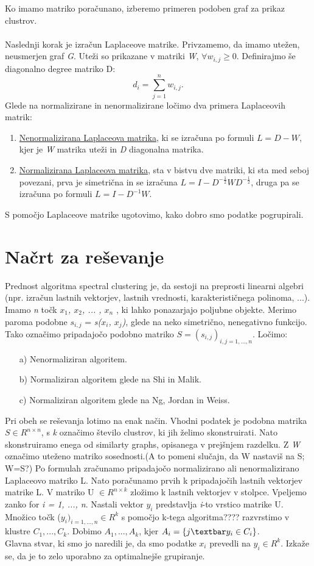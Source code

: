 \documentclass[a4paper, 10pt]{article}
\begin{document}
Ko imamo matriko poračunano, izberemo primeren podoben graf za prikaz clustrov.\\
\\
Naslednji korak je izračun Laplaceove matrike. Privzamemo, da imamo utežen, neusmerjen graf \textsl{G}. Uteži so prikazane v matriki \textsl{W}, $\forall w_{i,j}\geq 0$. Definirajmo še diagonalno degree matriko D: $$ d_i = \sum_{j=1}^n w_{i,j}.$$Glede na normalizirane in nenormalizirane ločimo dva primera Laplaceovih matrik:\\
\begin{enumerate}
\item\underline{Nenormalizirana Laplaceova matrika}, ki se izračuna po formuli $L = D - W$, kjer je \textsl{W} matrika uteži in \textsl{D} diagonalna matrika.
\item\underline{Normalizirana Laplaceova matrika}, sta v bistvu dve matriki, ki sta med seboj povezani, prva je simetrična in se izračuna $L = I - D^{-\frac{1}{2}}WD^{-\frac{1}{2}}$, druga pa se izračuna po formuli $L = I - D^{-1}W$.
\end{enumerate}
S pomočjo Laplaceove matrike ugotovimo, kako dobro smo podatke pogrupirali.

\section{Načrt za reševanje}
Prednost algoritma spectral clustering je, da sestoji na preprosti linearni algebri (npr. izračun lastnih vektorjev, lastnih vrednosti, karakterističnega polinoma, ...). Imamo \textsl{n} točk \textsl{$x_1$, $x_2$, ... , $x_n$ }, ki lahko ponazarjajo poljubne objekte. Merimo paroma podobne  \textsl{$s_{i,j}$} =  \textsl{s($x_i$, $x_j$)}, glede na neko simetrično, nenegativno funkcijo. Tako označimo pripadajočo podobno matriko $S=(s_{i,j})_{i,j = 1,..., n}$. Ločimo:
\begin{itemize}
\item[a)] Nenormaliziran algoritem.
\item[b)] Normaliziran algoritem glede na Shi in Malik.
\item[c)] Normaliziran algoritem glede na Ng, Jordan in Weiss.
\end{itemize}
Pri obeh se reševanja lotimo na enak način. Vhodni podatek je podobna matrika $S\in R^{n\times n}$, s  \textsl{k} označimo število clustrov, ki jih želimo skonstruirati. Nato skonstruiramo enega od similarty graphs, opisanega v prejšnjem razdelku. Z \textsl{W} označimo uteženo matriko sosednosti.(A to pomeni slučajn, da W nastaviš na S; W=S?) Po formulah zračunamo pripadajočo normalizirano ali nenormalizirano Laplaceovo matriko L. Nato poračunamo prvih k pripadajočih lastnih vektorjev matrike L. V matriko U $\in R^{n \times k}$ zložimo k lastnih vektorjev v stolpce. Vpeljemo zanko for \textsl{i = 1, ..., n}. Nastali vektor $y_i$ predstavlja \textsl{i}-to vrstico matrike U. Množico točk ($y_i)_{i = 1, ..., n}\in R^k$ s pomočjo k-tega algoritma???? razvrstimo v klustre $C_1, ..., C_k$. Dobimo $A_1, ..., A_k$, kjer $A_i=\{j\textbar y_i\in C_i\}$.\\
Glavna stvar, ki smo jo naredili je, da smo podatke $x_i$ prevedli na $y_i\in R^{k}$. Izkaže se, da je to zelo uporabno za optimalnejše grupiranje.
\end{document}

